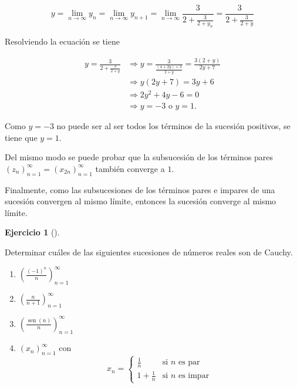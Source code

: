 \documentclass[
  a4paper,
]{scrreport}
\theoremstyle{definition}
\newtheorem{exercise}{Ejercicio}[chapter]
\theoremstyle{remark}
\begin{document}
\begin{tcolorbox}
\begin{enumerate}
  \[
   y = \lim_{n\to\infty}y_n = \lim_{n\to\infty}y_{n+1} = \lim_{n\to\infty}\frac{3}{2+\frac{3}{2+y_n}} = \frac{3}{2+\frac{3}{2+y}}
   \]

  Resolviendo la ecuación se tiene

  \begin{align*}
   y=\frac{3}{2+\frac{3}{2+y}} &\Rightarrow y= \frac{3}{\frac{(4+2y)+3}{2+y}} = \frac{3(2+y)}{2y+7} \\ 
   &\Rightarrow y(2y+7) = 3y+6 \\ 
   & \Rightarrow 2y^2+4y-6 = 0\\ 
   &\Rightarrow y=-3 \mbox{ o } y=1.
   \end{align*}

  Como \(y=-3\) no puede ser al ser todos los términos de la sucesión
  positivos, se tiene que \(y=1\).

  Del mismo modo se puede probar que la subsucesión de los términos
  pares \((z_n)_{n=1}^\infty = (x_{2n})_{n=1}^\infty\) también converge
  a \(1\).

  Finalmente, como las subsucesiones de los términos pares e impares de
  una sucesión convergen al mismo límite, entonces la sucesión converge
  al mismo límite.
\end{enumerate}

\end{tcolorbox}

\begin{exercise}[]\protect\hypertarget{exr-sucesiones-cauchy}{}\label{exr-sucesiones-cauchy}

Determinar cuáles de las siguientes sucesiones de números reales son de
Cauchy.

\begin{enumerate}
\def\labelenumi{\alph{enumi}.}
\item
  \(\left(\frac{(-1)^n}{n}\right)_{n=1}^\infty\)
\item
  \(\left(\frac{n}{n+1}\right)_{n=1}^\infty\)
\item
  \(\left(\frac{\operatorname{sen}(n)}{n}\right)_{n=1}^\infty\)
\item
  \((x_n)_{n=1}^\infty\) con \[
  x_n=
  \begin{cases}
  \frac{1}{n} & \mbox{si $n$ es par}\\
  1+\frac{1}{n} & \mbox{si $n$ es impar}
  \end{cases}
  \]
\end{enumerate}

\end{exercise}
\end{document}
